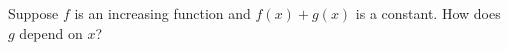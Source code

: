 \documentclass{ximera}
\begin{document}
\begin{problem}

  Suppose $f$ is an increasing function and $f(x) + g(x)$ is a constant.  How does $g$ depend on $x$?
  \begin{multipleChoice}
  \end{multipleChoice}
\end{problem}
\end{document}
